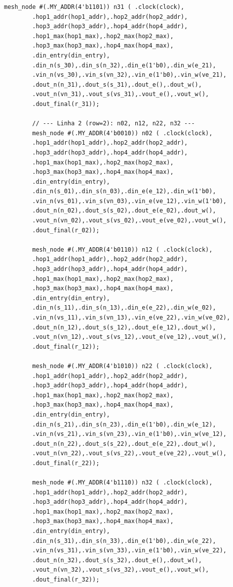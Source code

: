 \documentclass[12pt, a4paper]{article}
\begin{document}
\begin{lstlisting}[style=verilog, caption={\texttt{mesh\_4x4.v} --- Estrutura de interligação dos 16 nós da rede \textit{mesh} 4$\times$4, com fiação completa de dados e sinais de validade.}, label={lst:mesh4x4}]
		mesh_node #(.MY_ADDR(4'b1101)) n31 ( .clock(clock),
		.hop1_addr(hop1_addr),.hop2_addr(hop2_addr),
		.hop3_addr(hop3_addr),.hop4_addr(hop4_addr),
		.hop1_max(hop1_max),.hop2_max(hop2_max),
		.hop3_max(hop3_max),.hop4_max(hop4_max),
		.din_entry(din_entry),
		.din_n(s_30),.din_s(n_32),.din_e(1'b0),.din_w(e_21),
		.vin_n(vs_30),.vin_s(vn_32),.vin_e(1'b0),.vin_w(ve_21),
		.dout_n(n_31),.dout_s(s_31),.dout_e(),.dout_w(),
		.vout_n(vn_31),.vout_s(vs_31),.vout_e(),.vout_w(),
		.dout_final(r_31));
		
		// --- Linha 2 (row=2): n02, n12, n22, n32 ---
		mesh_node #(.MY_ADDR(4'b0010)) n02 ( .clock(clock),
		.hop1_addr(hop1_addr),.hop2_addr(hop2_addr),
		.hop3_addr(hop3_addr),.hop4_addr(hop4_addr),
		.hop1_max(hop1_max),.hop2_max(hop2_max),
		.hop3_max(hop3_max),.hop4_max(hop4_max),
		.din_entry(din_entry),
		.din_n(s_01),.din_s(n_03),.din_e(e_12),.din_w(1'b0),
		.vin_n(vs_01),.vin_s(vn_03),.vin_e(ve_12),.vin_w(1'b0),
		.dout_n(n_02),.dout_s(s_02),.dout_e(e_02),.dout_w(),
		.vout_n(vn_02),.vout_s(vs_02),.vout_e(ve_02),.vout_w(),
		.dout_final(r_02));
		
		mesh_node #(.MY_ADDR(4'b0110)) n12 ( .clock(clock),
		.hop1_addr(hop1_addr),.hop2_addr(hop2_addr),
		.hop3_addr(hop3_addr),.hop4_addr(hop4_addr),
		.hop1_max(hop1_max),.hop2_max(hop2_max),
		.hop3_max(hop3_max),.hop4_max(hop4_max),
		.din_entry(din_entry),
		.din_n(s_11),.din_s(n_13),.din_e(e_22),.din_w(e_02),
		.vin_n(vs_11),.vin_s(vn_13),.vin_e(ve_22),.vin_w(ve_02),
		.dout_n(n_12),.dout_s(s_12),.dout_e(e_12),.dout_w(),
		.vout_n(vn_12),.vout_s(vs_12),.vout_e(ve_12),.vout_w(),
		.dout_final(r_12));
		
		mesh_node #(.MY_ADDR(4'b1010)) n22 ( .clock(clock),
		.hop1_addr(hop1_addr),.hop2_addr(hop2_addr),
		.hop3_addr(hop3_addr),.hop4_addr(hop4_addr),
		.hop1_max(hop1_max),.hop2_max(hop2_max),
		.hop3_max(hop3_max),.hop4_max(hop4_max),
		.din_entry(din_entry),
		.din_n(s_21),.din_s(n_23),.din_e(1'b0),.din_w(e_12),
		.vin_n(vs_21),.vin_s(vn_23),.vin_e(1'b0),.vin_w(ve_12),
		.dout_n(n_22),.dout_s(s_22),.dout_e(e_22),.dout_w(),
		.vout_n(vn_22),.vout_s(vs_22),.vout_e(ve_22),.vout_w(),
		.dout_final(r_22));
		
		mesh_node #(.MY_ADDR(4'b1110)) n32 ( .clock(clock),
		.hop1_addr(hop1_addr),.hop2_addr(hop2_addr),
		.hop3_addr(hop3_addr),.hop4_addr(hop4_addr),
		.hop1_max(hop1_max),.hop2_max(hop2_max),
		.hop3_max(hop3_max),.hop4_max(hop4_max),
		.din_entry(din_entry),
		.din_n(s_31),.din_s(n_33),.din_e(1'b0),.din_w(e_22),
		.vin_n(vs_31),.vin_s(vn_33),.vin_e(1'b0),.vin_w(ve_22),
		.dout_n(n_32),.dout_s(s_32),.dout_e(),.dout_w(),
		.vout_n(vn_32),.vout_s(vs_32),.vout_e(),.vout_w(),
		.dout_final(r_32));
		

\end{lstlisting}
\end{document}
